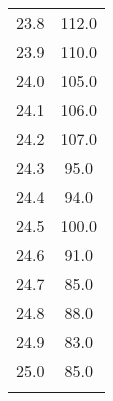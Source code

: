 \begin{table}
\begin{tabular}{S[table-format=1.1] S[table-format=4.1]}
    23.8&	112.0\\
    23.9&	110.0\\
    24.0&	105.0\\
    24.1&	106.0\\
    24.2&	107.0\\
    24.3&	95.0\\
    24.4&	94.0\\
    24.5&	100.0\\
    24.6&	91.0\\
    24.7&	85.0\\
    24.8&	88.0\\
    24.9&	83.0\\
    25.0&	85.0\\
    &\\
        \bottomrule
    \end{tabular}
\end{table}